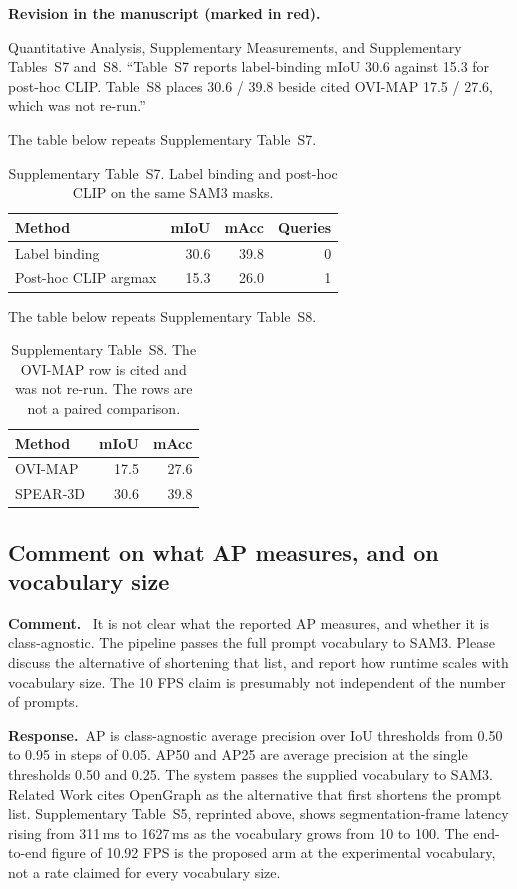 \documentclass[11pt]{article}
\newcommand{\revcomment}[1]{%
  \par\vspace{0.6em}\noindent\textcolor{revblue}{\textbf{Comment.}}\ %
  \textcolor{revblue}{#1}\par\vspace{0.4em}}
\newcommand{\revresponse}[1]{%
  \par\noindent\textbf{Response.}\ #1\par\vspace{0.3em}}
\newcommand{\revchange}[1]{%
  \par\noindent\textbf{Revision in the manuscript (marked in red).}\par
  \noindent\textcolor{revred}{#1}\par\vspace{0.8em}}
\begin{document}
\revchange{Quantitative Analysis, Supplementary Measurements, and Supplementary Tables~S7 and~S8. ``Table~S7 reports label-binding mIoU 30.6 against 15.3 for post-hoc CLIP. Table~S8 places 30.6 / 39.8 beside cited OVI-MAP 17.5 / 27.6, which was not re-run.''}

\noindent The table below repeats Supplementary Table~S7.

\begin{table}[ht]
\centering
\caption{Supplementary Table~S7. Label binding and post-hoc CLIP on the same SAM3 masks.}
\label{tab:bind}
\small
\begin{tabular}{lrrr}
\toprule
Method & mIoU & mAcc & Queries \\
\midrule
Label binding & 30.6 & 39.8 & 0 \\
Post-hoc CLIP argmax & 15.3 & 26.0 & 1 \\
\bottomrule
\end{tabular}
\end{table}

\noindent The table below repeats Supplementary Table~S8.

\begin{table}[ht]
\centering
\caption{Supplementary Table~S8. The OVI-MAP row is cited and was not re-run. The rows are not a paired comparison.}
\label{tab:ovimap}
\small
\begin{tabular}{lrr}
\toprule
Method & mIoU & mAcc \\
\midrule
OVI-MAP & 17.5 & 27.6 \\
SPEAR-3D & 30.6 & 39.8 \\
\bottomrule
\end{tabular}
\end{table}

\subsection*{Comment on what AP measures, and on vocabulary size}

\revcomment{It is not clear what the reported AP measures, and whether it is class-agnostic. The pipeline passes the full prompt vocabulary to SAM3. Please discuss the alternative of shortening that list, and report how runtime scales with vocabulary size. The 10 FPS claim is presumably not independent of the number of prompts.}

\revresponse{AP is class-agnostic average precision over IoU thresholds from 0.50 to 0.95 in steps of 0.05. AP50 and AP25 are average precision at the single thresholds 0.50 and 0.25. The system passes the supplied vocabulary to SAM3. Related Work cites OpenGraph as the alternative that first shortens the prompt list. Supplementary Table~S5, reprinted above, shows segmentation-frame latency rising from 311\,ms to 1627\,ms as the vocabulary grows from 10 to 100. The end-to-end figure of 10.92 FPS is the proposed arm at the experimental vocabulary, not a rate claimed for every vocabulary size.}
\end{document}
